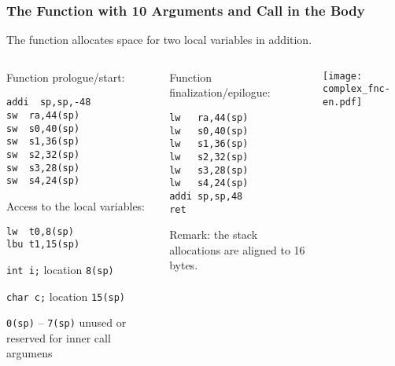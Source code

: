 \documentclass{beamer}
\begin{document}
\begin{frame}[fragile,shrink=5]
\frametitle{The Function with 10 Arguments and Call in the Body}

The function allocates space for two local variables in addition.

\begin{columns}
\begin{column}{0.35\textwidth}
Function prologue/start:

\begin{verbatim}
addi  sp,sp,-48
sw  ra,44(sp)
sw  s0,40(sp)
sw  s1,36(sp)
sw  s2,32(sp)
sw  s3,28(sp)
sw  s4,24(sp)
\end{verbatim}

Access to the local variables:
\begin{verbatim}
lw  t0,8(sp)
lbu t1,15(sp)
\end{verbatim}

\texttt{int i;} location \texttt{8(sp)}

\texttt{char c;} location \texttt{15(sp)}

\texttt{0(sp)} -- \texttt{7(sp)} unused or reserved for inner call argumens


\end{column}   
\begin{column}{0.29\textwidth}
Function finalization/epilogue:

\begin{verbatim}
lw   ra,44(sp)
lw   s0,40(sp)
lw   s1,36(sp)
lw   s2,32(sp)
lw   s3,28(sp)
lw   s4,24(sp)
addi sp,sp,48
ret
\end{verbatim}

Remark: the stack allocations are aligned to 16 bytes.

\end{column}
\begin{column}{0.35\textwidth}  
\texttt{[image: complex\_fnc-en.pdf]}
\end{column}
\end{columns}
\end{frame}
\end{document}
